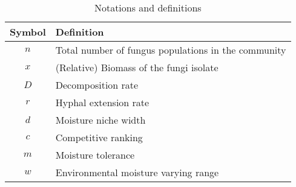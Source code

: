 \begin{table}[h]
    \begin{center}
        \caption{Notations and definitions}
        \begin{tabular}{cl}
            \toprule
            Symbol & Definition                                          \\
            \midrule
            $n$    & Total number of fungus populations in the community \\
            $x$    & (Relative) Biomass of the fungi isolate             \\
            $D$    & Decomposition rate                                  \\
            $r$    & Hyphal extension rate                               \\
            $d$    & Moisture niche width                                \\
            $c$    & Competitive ranking                                 \\
            $m$    & Moisture tolerance                                  \\
            $w$    & Environmental moisture varying range                \\
            \bottomrule
        \end{tabular}
    \end{center}
\end{table}
